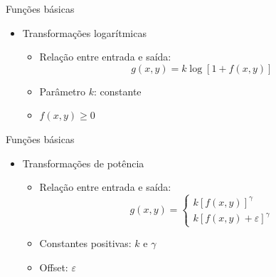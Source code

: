      \begin{slide}[toc=]{Funções básicas}
         \begin{itemize}[type=1]
            \item Transformações logarítmicas 
            \begin{itemize}
               \item Relação entre entrada e saída: \begin{equation*}g(x,y) = k\log\left [1+f(x,y)\right ]\end{equation*}
               \item Parâmetro $k$: constante 
               \item $f(x,y)\geq 0$
            \end{itemize}
         \end{itemize}         
      \end{slide}
   
      \begin{slide}[toc=]{Funções básicas}
         
         \begin{itemize}[type=1]
            \item Transformações de potência 
            \begin{itemize}
               \item Relação entre entrada e saída: \begin{equation*}g(x,y) = \begin{cases}
                                                                               k\left [f(x,y)\right ]^\gamma\\
                                                                               k\left [f(x,y)+\varepsilon\right ]^\gamma

                                                                              \end{cases}
                                                    \end{equation*}
               \item Constantes positivas: $k$ e $\gamma$
               \item Offset: $\varepsilon$
            \end{itemize}
         \end{itemize}
      \end{slide}
         
